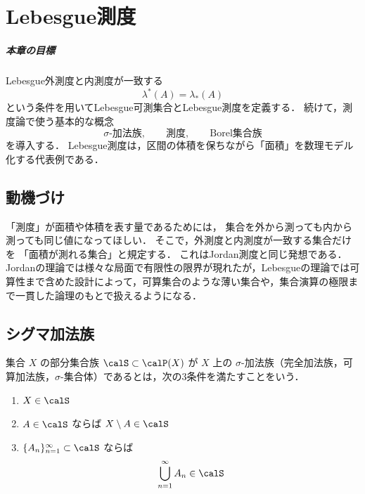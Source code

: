 \setcounter{chapter}{4}
\chapter{Lebesgue測度}

\paragraph{本章の目標}
Lebesgue外測度と内測度が一致する
\[
\lambda^*(A)=\lambda_*(A)
\]
という条件を用いてLebesgue可測集合とLebesgue測度を定義する．
続けて，測度論で使う基本的な概念
\[
\text{$\sigma$-加法族},\qquad \text{測度},\qquad \text{Borel集合族}
\]
を導入する．
Lebesgue測度は，区間の体積を保ちながら「面積」を数理モデル化する代表例である．

\section{動機づけ}

「測度」が面積や体積を表す量であるためには，
集合を外から測っても内から測っても同じ値になってほしい．
そこで，外測度と内測度が一致する集合だけを
「面積が測れる集合」と規定する．
これはJordan測度と同じ発想である．
Jordanの理論では様々な局面で有限性の限界が現れたが，Lebesgueの理論では可算性まで含めた設計によって，可算集合のような薄い集合や，集合演算の極限まで一貫した論理のもとで扱えるようになる．

\section{シグマ加法族}

\begin{definition}
集合 $X$ の部分集合族 $\calS \subset \calP(X)$ が
$X$ 上の $\sigma$-加法族（完全加法族，可算加法族，$\sigma$-集合体）であるとは，次の3条件を満たすことをいう．
\begin{enumerate}
    \item $X \in \calS$
    \item $A \in \calS$ ならば $X \setminus A \in \calS$
    \item $\{A_n\}_{n=1}^{\infty} \subset \calS$ ならば
    \[
    \bigcup_{n=1}^{\infty} A_n \in \calS
    \]
\end{enumerate}
\end{definition}

